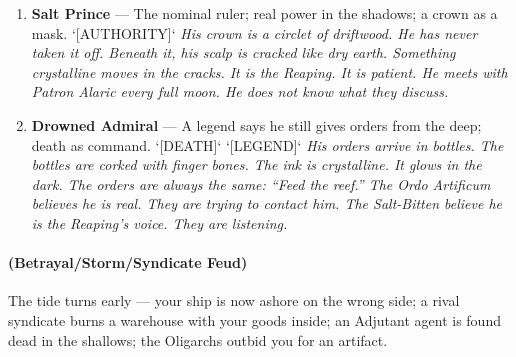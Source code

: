 \begin{enumerate}
\item[K] \textbf{Salt Prince} --- The nominal ruler; real power in the shadows; a crown as a mask. `[AUTHORITY]`
  \hfill \textit{His crown is a circlet of driftwood. He has never taken it off. Beneath it, his scalp is cracked like dry earth. Something crystalline moves in the cracks. It is the Reaping. It is patient. He meets with Patron Alaric every full moon. He does not know what they discuss.}
\item[A] \textbf{Drowned Admiral} --- A legend says he still gives orders from the deep; death as command. `[DEATH]` `[LEGEND]`
  \hfill \textit{His orders arrive in bottles. The bottles are corked with finger bones. The ink is crystalline. It glows in the dark. The orders are always the same: ``Feed the reef.'' The Ordo Artificum believes he is real. They are trying to contact him. The Salt-Bitten believe he is the Reaping's voice. They are listening.}
\end{enumerate}

\paragraph*{(Betrayal/Storm/Syndicate Feud)} The tide turns early --- your ship is now ashore on the wrong side; a rival syndicate burns a warehouse with your goods inside; an Adjutant agent is found dead in the shallows; the Oligarchs outbid you for an artifact.


